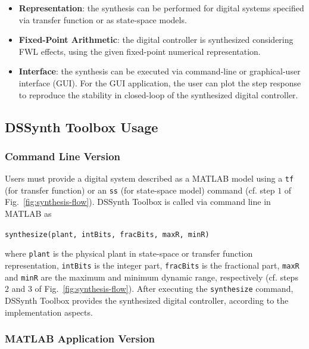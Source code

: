 \documentclass[10pt,conference]{IEEEtran}
\newcommand\tool{{DSSynth Toolbox}\xspace}
\begin{document}
\begin{itemize}
\item \textbf{Representation}: the synthesis can be 
performed for digital systems specified via 
transfer function or as state-space models.
\item \textbf{Fixed-Point Arithmetic}: the digital 
controller is synthesized considering FWL effects, 
using the given fixed-point numerical representation.
\item \textbf{Interface}: the synthesis can be executed 
via command-line or graphical-user interface (GUI). 
For the GUI application, the user can plot the step response 
to reproduce the stability in closed-loop of the synthesized digital controller.
\end{itemize}

\subsection{\tool Usage}

\subsubsection{Command Line Version}

Users must provide a digital system described as a MATLAB model 
using a \texttt{tf} (for transfer function) or an \texttt{ss} (for state-space model) 
command (cf. step $1$ of Fig.~\ref{fig:synthesis-flow}).
\tool is called via command line in MATLAB as 

\begin{center} 
\texttt{synthesize(plant, intBits, fracBits, maxR, minR)}
\end{center} 

\noindent where \texttt{plant} is the physical plant in state-space or transfer function representation, 
\texttt{intBits} is the integer part, \texttt{fracBits} is the fractional part, \texttt{maxR} and \texttt{minR} 
are the maximum and minimum dynamic range, respectively (cf. steps $2$ and $3$ of Fig.~\ref{fig:synthesis-flow}).
%
After executing the \texttt{synthesize} command, 
\tool provides the synthesized digital controller, according to the implementation aspects. 

\subsubsection{MATLAB Application Version} 
\end{document}
